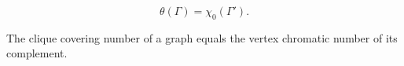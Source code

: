 $$\theta(\Gamma) = \chi_0(\Gamma').$$

The clique covering number of a graph equals the vertex chromatic number of its complement.
